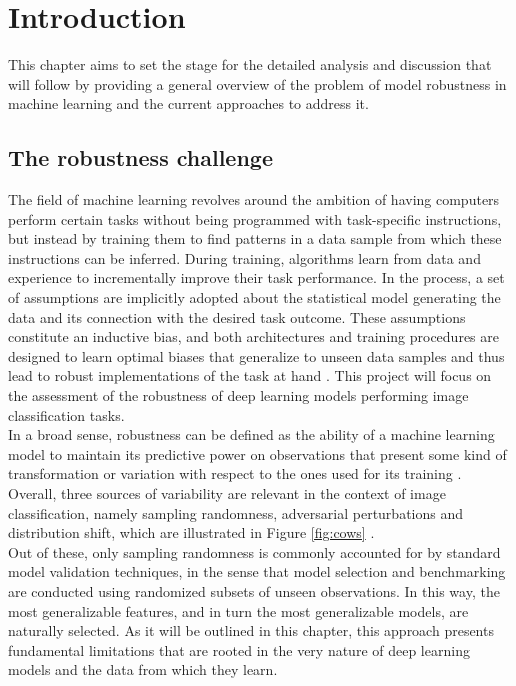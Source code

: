 \chapter{Introduction}\label{sec:introduction}

This chapter aims to set the stage for the detailed analysis and discussion that will follow by 
providing a general overview of the problem of model robustness in 
machine learning and the current approaches to address it.

\section{The robustness challenge}\label{sec:motivation}

The field of machine learning revolves around the ambition of having computers
perform certain tasks without being programmed with task-specific instructions,
but instead by training them to find patterns in a data sample from which these 
instructions can be inferred. During training, algorithms learn from data and
experience to incrementally improve their task performance. In the process, a set
of assumptions are implicitly adopted about the statistical model generating the data 
and its connection with the desired task outcome. These assumptions constitute an 
inductive bias, and both architectures and training procedures are designed to
learn optimal biases that generalize to unseen data samples and thus lead to robust
implementations of the task at hand
\cite{p.murphyProbabilisticMachineLearning2022,m.bishopPatternRecognitionMachine2006}.
This project will focus on the assessment of the robustness of deep learning models 
performing image classification tasks.\\ 

In a broad sense, robustness can be defined as the ability of a machine learning 
model to maintain its predictive power on observations that present 
some kind of transformation or variation 
with respect to the ones used for its training
\cite{quinonero-candelaDatasetShiftMachine2009}.
Overall, three sources of variability are relevant in the context
of image classification, namely sampling randomness, adversarial
perturbations and distribution shift, which are illustrated in Figure \ref{fig:cows} 
\cite{buhmannPosteriorAgreementModel2022}.\\

Out of these, only sampling randomness is commonly accounted for by 
standard model validation techniques, in the sense that model selection 
and benchmarking are conducted using randomized subsets of unseen observations. 
In this way, the most generalizable features, and in turn the most generalizable 
models, are naturally selected. As it will be outlined in this chapter, 
this approach presents fundamental limitations
that are rooted in the very nature of deep learning models and
the data from which they learn. \\

